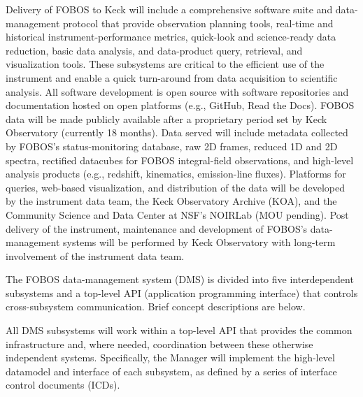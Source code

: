 \documentclass[oneside,11pt]{amsart}
\begin{document}

\begin{center}
\end{center}


\smallskip

Delivery of FOBOS to Keck will include a comprehensive software suite
and data-management protocol that provide observation planning tools,
real-time and historical instrument-performance metrics, quick-look and
science-ready data reduction, basic data analysis, and data-product
query, retrieval, and visualization tools.  These subsystems are
critical to the efficient use of the instrument and enable a quick
turn-around from data acquisition to scientific analysis.  All software
development is open source with software repositories and documentation
hosted on open platforms (e.g., GitHub, Read the Docs).  FOBOS data will
be made publicly available after a proprietary period set by Keck
Observatory (currently 18 months).  Data served will include metadata
collected by FOBOS's status-monitoring database, raw 2D frames, reduced
1D and 2D spectra, rectified datacubes for FOBOS integral-field
observations, and high-level analysis products (e.g., redshift,
kinematics, emission-line fluxes).  Platforms for queries, web-based
visualization, and distribution of the data will be developed by the
instrument data team, the Keck Observatory Archive (KOA), and the
Community Science and Data Center at NSF’s NOIRLab (MOU pending).  Post
delivery of the instrument, maintenance and development of FOBOS's
data-management systems will be performed by Keck Observatory with
long-term involvement of the instrument data team.

\medskip


The FOBOS data-management system (DMS) is divided into five
interdependent subsystems and a top-level API (application
programming interface) that controls cross-subsystem communication.
Brief concept descriptions are below.

\smallskip

 All DMS subsystems will work within a
top-level API that provides the common infrastructure and, where needed,
coordination between these otherwise independent systems.  Specifically,
the Manager will implement the high-level datamodel and interface of
each subsystem, as defined by a series of interface control documents
(ICDs).
\end{document}
